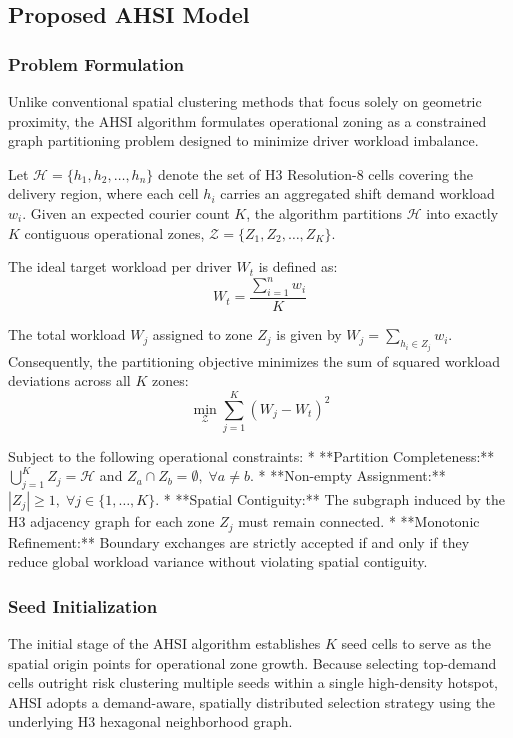 \documentclass{article}
\begin{document}
\subsection{Proposed AHSI Model}
\subsubsection{Problem Formulation}
\label{subsubsec:ahsi_problem_formulation}

Unlike conventional spatial clustering methods that focus solely on geometric proximity, the AHSI algorithm formulates operational zoning as a constrained graph partitioning problem designed to minimize driver workload imbalance.

Let $\mathcal{H} = \{h_1, h_2, \dots, h_n\}$ denote the set of H3 Resolution-8 cells covering the delivery region, where each cell $h_i$ carries an aggregated shift demand workload $w_i$. Given an expected courier count $K$, the algorithm partitions $\mathcal{H}$ into exactly $K$ contiguous operational zones, $\mathcal{Z} = \{Z_1, Z_2, \dots, Z_K\}$.

The ideal target workload per driver $W_t$ is defined as:
$$
W_t = \frac{\sum_{i=1}^{n} w_i}{K}
$$

The total workload $W_j$ assigned to zone $Z_j$ is given by $W_j = \sum_{h_i \in Z_j} w_i$. Consequently, the partitioning objective minimizes the sum of squared workload deviations across all $K$ zones:
$$
\min_{\mathcal{Z}} \sum_{j=1}^{K} (W_j - W_t)^2
$$

Subject to the following operational constraints:
*   **Partition Completeness:** $\bigcup_{j=1}^{K} Z_j = \mathcal{H}$ and $Z_a \cap Z_b = \emptyset, \; \forall a \neq b$.
*   **Non-empty Assignment:** $|Z_j| \ge 1, \; \forall j \in \{1, \dots, K\}$.
*   **Spatial Contiguity:** The subgraph induced by the H3 adjacency graph for each zone $Z_j$ must remain connected.
*   **Monotonic Refinement:** Boundary exchanges are strictly accepted if and only if they reduce global workload variance without violating spatial contiguity.

\subsubsection{Seed Initialization}
\label{subsubsec:ahsi_seed_initialization}

The initial stage of the AHSI algorithm establishes $K$ seed cells to serve as the spatial origin points for operational zone growth. Because selecting top-demand cells outright risk clustering multiple seeds within a single high-density hotspot, AHSI adopts a demand-aware, spatially distributed selection strategy using the underlying H3 hexagonal neighborhood graph.
\end{document}
